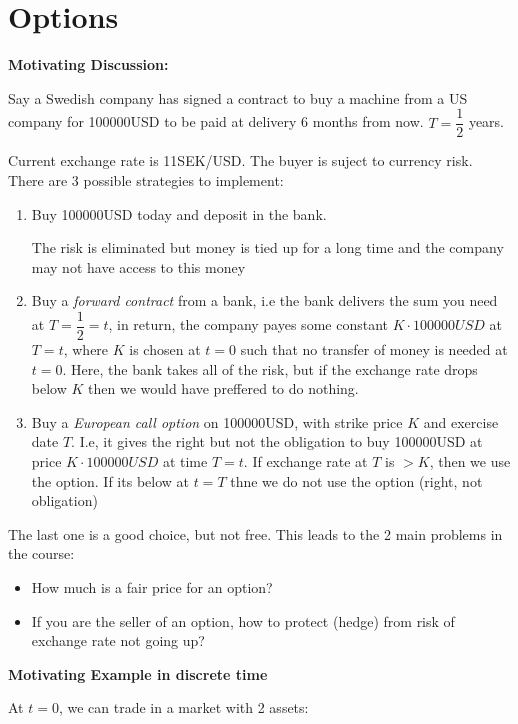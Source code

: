 \section{Options}
\noindent\textbf{Motivating Discussion:}\par
\noindent Say a Swedish company has signed a contract to buy a machine from a US company for 100000USD to be paid at delivery 6 months from now. $T = \dfrac{1}{2}$ years.\par
\noindent Current exchange rate is 11SEK/USD. The buyer is suject to currency risk. There are 3 possible strategies to implement:\par
\begin{enumerate}[leftmargin=*]
  \item Buy 100000USD today and deposit in the bank.\par
    The risk is eliminated but money is tied up for a long time and the company may not have access to this money
  \item Buy a \textit{forward contract} from a bank, i.e the bank delivers the sum you need at $T = \dfrac{1}{2} = t$, in return, the company payes some constant $K\cdot100000USD$ at $T = t$, where $K$ is chosen at $t = 0$ such that no transfer of money is needed at $t = 0$. Here, the bank takes all of the risk, but if the exchange rate drops below $K$ then we would have preffered to do nothing.
  \item Buy a \textit{European call option} on 100000USD, with strike price $K$ and exercise date $T$. I.e, it gives the right but not the obligation to buy 100000USD at price $K\cdot100000USD$ at time $T = t$. If exchange rate at $T$ is $>K$, then we use the option. If its below at $t = T$ thne we do not use the option (right, not obligation)
\end{enumerate}
\par\bigskip
\noindent The last one is a good choice, but not free. This leads to the 2 main problems in the course:\par
\begin{itemize}
  \item How much is a fair price for an option?
  \item If you are the seller of an option, how to protect (hedge) from risk of exchange rate not going up?
\end{itemize}
\par\bigskip
\noindent\textbf{Motivating Example in discrete time}\par
\noindent At $t=0$, we can trade in a market with 2 assets:\par
